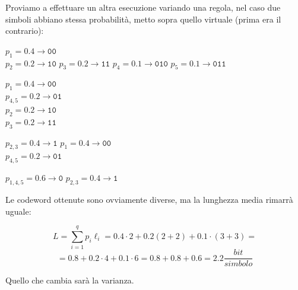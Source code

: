 Proviamo a effettuare un altra esecuzione variando una regola, nel caso due simboli abbiano stessa probabilità, metto sopra quello virtuale (prima era il contrario):
\small{
	\begin{multicols}{4}
		\begin{center}
			$p_1 = 0.4 \rightarrow \texttt{00}$\\
			$p_{2} = 0.2 \rightarrow \texttt{10}$
			$p_{3} = 0.2 \rightarrow \texttt{11}$
			$p_{4} = 0.1 \rightarrow \texttt{010}$
			$p_{5} = 0.1 \rightarrow \texttt{011}$
		\end{center}
		
		\begin{center}
			$p_1 = 0.4 \rightarrow \texttt{00}$\\
			$p_{4,5} = 0.2 \rightarrow \texttt{01}$\\
			$p_{2} = 0.2 \rightarrow \texttt{10}$\\
			$p_{3} = 0.2 \rightarrow \texttt{11}$	
		\end{center}
	
		
		\columnbreak
		
		\begin{center}
			$p_{2,3} = 0.4 \rightarrow \texttt{1}$
			$p_1 = 0.4 \rightarrow \texttt{00}$\\
			$p_{4,5} = 0.2 \rightarrow \texttt{01}$
		\end{center}  
	
		\columnbreak
		
		\begin{center}
			$p_{1,4,5} = 0.6 \rightarrow \texttt{0}$
			$p_{2,3} = 0.4 \rightarrow \texttt{1}$\\
		\end{center}
		
		\columnbreak
	\end{multicols}
}

Le codeword ottenute sono ovviamente diverse, ma la lunghezza media rimarrà uguale:

\begin{equation*}
L = \sum_{i=1}^qp_i\ell_i = 0.4 \cdot 2 + 0.2 (2+2) + 0.1 \cdot (3+3) = 
\end{equation*}
\begin{equation*}
= 0.8 + 0.2 \cdot 4 + 0.1 \cdot 6 = 0.8 +0.8+0.6 = 2.2\frac{bit}{simbolo}
\end{equation*}

Quello che cambia sarà la varianza.





